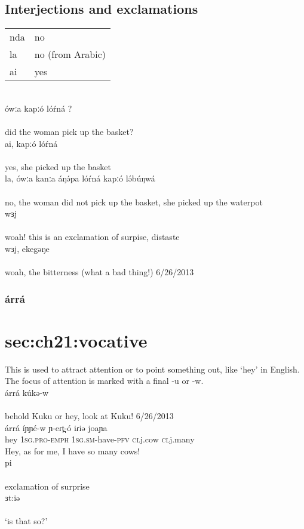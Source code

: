 \subsection{Interjections and exclamations}
\begin{tabular}[t]{ll}
nda 	&	no\\
la		&	no  (from Arabic)\\
ai		&	yes\\
\end{tabular}
\\
\gll ówːa kapːó lóŕná ? 		\\
\\
\trans		did the woman pick up the basket?\\
\gll ai, kapːó lóŕná 		\\
\\
\trans			yes, she picked up the basket\\
\gll la, ówːa kanːa áŋə́pa lóŕná kapːó lə́búŋwá\\
\\
\trans	no, the woman did not pick up the basket, she picked up the waterpot\\
\gll wɜj		\\
\\
\trans	woah! this is an exclamation of surpise, distaste\\
\gll wɜj, ekegəŋe	\\
\\
\trans	woah, the bitterness (what a bad thing!)	\hfill 6/26/2013\\


\subsubsection{árrá}\section{sec:ch21:vocative}
This is used to attract attention or to point something out, like ‘hey’ in English. The focus of attention is marked with a final -u or -w. 
\\
\gll árrá kúkə-w\\
\\
\trans	behold Kuku or hey, look at Kuku!			\hfill 6/26/2013\\

\gll árrá	íɲɲé-w 	ɲ-eɾt̪-ó 			iɾiə	 	joaɲa	\\
	hey  	1\textsc{sg.pro-emph}	1\textsc{sg.sm}-have-\textsc{pfv}  	\textsc{cl}j.cow  	\textsc{cl}j.many\\
\trans Hey, as for me, I have so many cows!\\

\gll pi	\\
\\
\trans exclamation of surprise\\
\gll ɜt:iə	\\
\\
\trans ‘is that so?’\\

